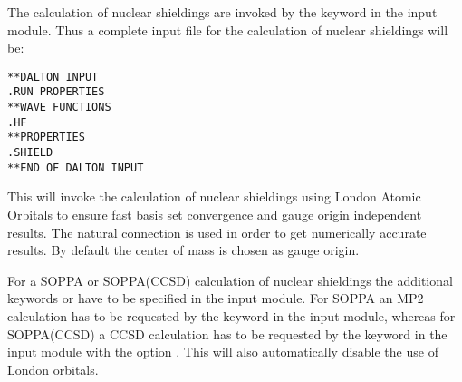 \begin{center}
\end{center}


The calculation of nuclear shieldings are
invoked by the
keyword  in the  input module. Thus
a complete input file for the calculation of nuclear shieldings will
be:

\begin{verbatim}
**DALTON INPUT
.RUN PROPERTIES
**WAVE FUNCTIONS
.HF
**PROPERTIES
.SHIELD
**END OF DALTON INPUT
\end{verbatim}

This will invoke the calculation of nuclear shieldings using
London Atomic Orbitals to ensure fast basis set
convergence and gauge
origin independent results. The natural connection
\cite{joklbkrthpjtca90}
is used in order to get
numerically accurate results. By default the center of mass is chosen as gauge
origin.

For a SOPPA or SOPPA(CCSD) calculation of
nuclear shieldings the additional keywords  or
 have to be specified in the  input
module. For SOPPA an MP2 calculation has to be requested by the keyword
 in the  input module, whereas for SOPPA(CCSD) a
CCSD calculation has to be requested by the keyword  in the  input module with the  option
. This will also automatically disable the use of London
orbitals. 

